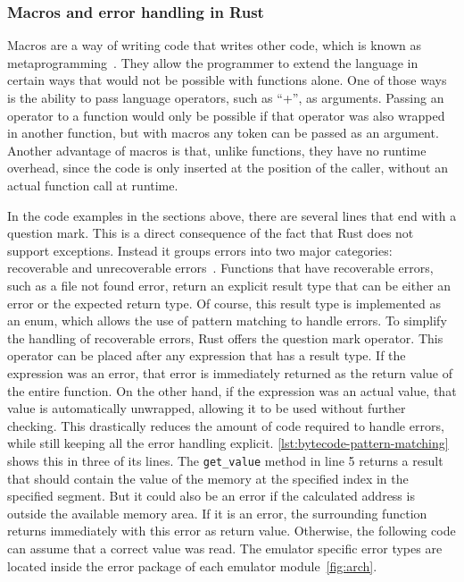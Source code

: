 \subsubsection{Macros and error handling in Rust} \label{macros-and-error-handling}
Macros are a way of writing code that writes other code, which is known as metaprogramming~\cite[Chapter~19.5]{klabnik2019rust}.
They allow the programmer to extend the language in certain ways that would not be possible with functions alone.
One of those ways is the ability to pass language operators, such as ``+'', as arguments.
Passing an operator to a function would only be possible if that operator was also wrapped in another function, but with macros any token can be passed as an argument.
Another advantage of macros is that, unlike functions, they have no runtime overhead, since the code is only inserted at the position of the caller, without an actual function call at runtime.

In the code examples in the sections above, there are several lines that end with a question mark.
This is a direct consequence of the fact that Rust does not support exceptions.
Instead it groups errors into two major categories: recoverable and unrecoverable errors~\cite[Chapter~9]{klabnik2019rust}.
Functions that have recoverable errors, such as a file not found error, return an explicit result type that can be either an error or the expected return type.
Of course, this result type is implemented as an enum, which allows the use of pattern matching to handle errors.
To simplify the handling of recoverable errors, Rust offers the question mark operator.
This operator can be placed after any expression that has a result type.
If the expression was an error, that error is immediately returned as the return value of the entire function.
On the other hand, if the expression was an actual value, that value is automatically unwrapped, allowing it to be used without further checking.
This drastically reduces the amount of code required to handle errors, while still keeping all the error handling explicit.
\cref{lst:bytecode-pattern-matching} shows this in three of its lines.
The \verb+get_value+ method in line 5 returns a result that should contain the value of the memory at the specified index in the specified segment.
But it could also be an error if the calculated address is outside the available memory area.
If it is an error, the surrounding function returns immediately with this error as return value.
Otherwise, the following code can assume that a correct value was read.
The emulator specific error types are located inside the error package of each emulator module~\ref{fig:arch}.

